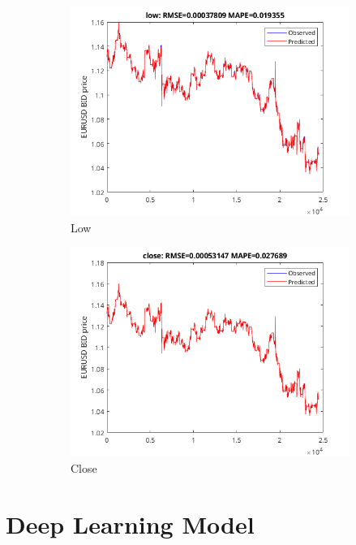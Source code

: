 \documentclass[11pt]{article}
\begin{document}
\begin{figure}[H]
\begin{subfigure}[b]{0.5\textwidth}
      \includegraphics[width=\textwidth,keepaspectratio]{figs/var20low.png}
      \caption{Low}
    \end{subfigure}
    \quad\quad\quad\quad\quad\quad\quad
    \begin{subfigure}[b]{0.5\textwidth}
      \includegraphics[width=\textwidth,keepaspectratio]{figs/var20close.png}
      \caption{Close}
    \end{subfigure}
    \caption{}
\end{figure}





\section{Deep Learning Model}
\end{document}
